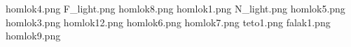 homlok4.png
F_light.png
homlok8.png
homlok1.png
N_light.png
homlok5.png
homlok3.png
homlok12.png
homlok6.png
homlok7.png
teto1.png
falak1.png
homlok9.png
